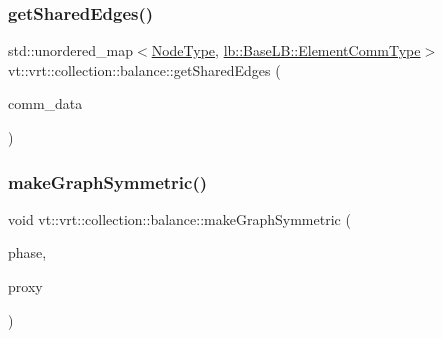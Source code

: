 \mbox{\label{namespacevt_1_1vrt_1_1collection_1_1balance_ac3a36cc89a7a64a5a0dc703562b5151f}} 
\subsubsection{\texorpdfstring{get\+Shared\+Edges()}{getSharedEdges()}}
{\footnotesize\ttfamily std\+::unordered\+\_\+map$<$\hyperlink{namespacevt_a866da9d0efc19c0a1ce79e9e492f47e2}{Node\+Type}, \hyperlink{structvt_1_1vrt_1_1collection_1_1lb_1_1_base_l_b_a83eb4daec14edfb8780422e95b8e38d3}{lb\+::\+Base\+L\+B\+::\+Element\+Comm\+Type}$>$ vt\+::vrt\+::collection\+::balance\+::get\+Shared\+Edges (\begin{DoxyParamCaption}\item[{\hyperlink{namespacevt_1_1elm_a38487cb8896b9b4763efa9022fab560e}{elm\+::\+Comm\+Map\+Type} const \&}]{comm\+\_\+data }\end{DoxyParamCaption})}

\mbox{\label{namespacevt_1_1vrt_1_1collection_1_1balance_adb94fe32f6565b52ab18e5e0131c48b0}} 
\subsubsection{\texorpdfstring{make\+Graph\+Symmetric()}{makeGraphSymmetric()}}
{\footnotesize\ttfamily void vt\+::vrt\+::collection\+::balance\+::make\+Graph\+Symmetric (\begin{DoxyParamCaption}\item[{\hyperlink{namespacevt_a46ce6733d5cdbd735d561b7b4029f6d7}{Phase\+Type}}]{phase,  }\item[{\hyperlink{structvt_1_1objgroup_1_1proxy_1_1_proxy}{objgroup\+::proxy\+::\+Proxy}$<$ \hyperlink{structvt_1_1vrt_1_1collection_1_1lb_1_1_base_l_b}{lb\+::\+Base\+LB} $>$}]{proxy }\end{DoxyParamCaption})}

